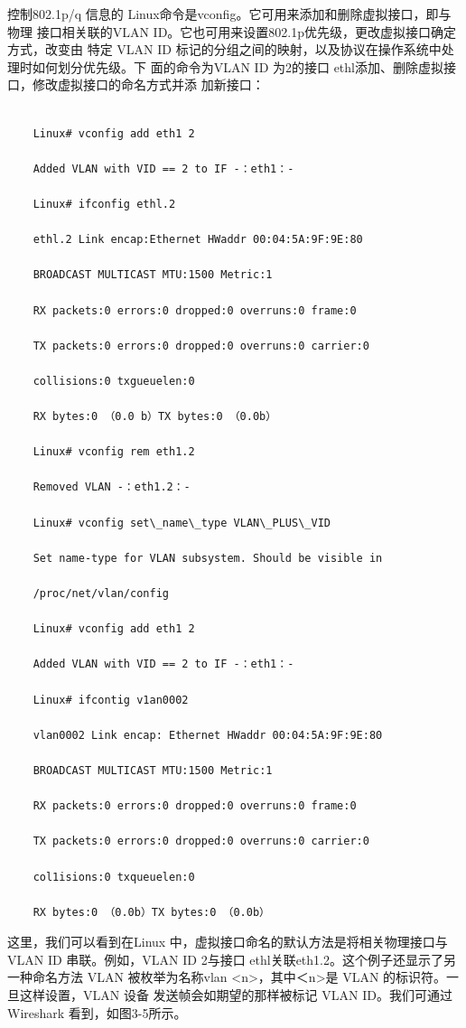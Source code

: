 控制802.1p/q 信息的 Linux命令是vconfig。它可用来添加和删除虚拟接口，即与物理
接口相关联的VLAN ID。它也可用来设置802.1p优先级，更改虚拟接口确定方式，改变由
特定 VLAN ID 标记的分组之间的映射，以及协议在操作系统中处理时如何划分优先级。下
面的命令为VLAN ID 为2的接口 ethl添加、删除虚拟接口，修改虚拟接口的命名方式并添
加新接口：
\begin{verbatim}
    
    Linux# vconfig add eth1 2
    
    Added VLAN with VID == 2 to IF -：eth1：-
    
    Linux# ifconfig ethl.2
    
    ethl.2 Link encap:Ethernet HWaddr 00:04:5A:9F:9E:80
    
    BROADCAST MULTICAST MTU:1500 Metric:1
    
    RX packets:0 errors:0 dropped:0 overruns:0 frame:0
    
    TX packets:0 errors:0 dropped:0 overruns:0 carrier:0
    
    collisions:0 txgueuelen:0
    
    RX bytes:0 （0.0 b）TX bytes:0 （0.0b）
    
    Linux# vconfig rem eth1.2
    
    Removed VLAN -：eth1.2：-
    
    Linux# vconfig set\_name\_type VLAN\_PLUS\_VID
    
    Set name-type for VLAN subsystem. Should be visible in
    
    /proc/net/vlan/config
    
    Linux# vconfig add eth1 2
    
    Added VLAN with VID == 2 to IF -：eth1：-
    
    Linux# ifcontig v1an0002
    
    vlan0002 Link encap: Ethernet HWaddr 00:04:5A:9F:9E:80
    
    BROADCAST MULTICAST MTU:1500 Metric:1
    
    RX packets:0 errors:0 dropped:0 overruns:0 frame:0
    
    TX packets:0 errors:0 dropped:0 overruns:0 carrier:0
    
    col1isions:0 txqueuelen:0
    
    RX bytes:0 （0.0b）TX bytes:0 （0.0b）
\end{verbatim}

这里，我们可以看到在Linux 中，虚拟接口命名的默认方法是将相关物理接口与 VLAN
ID 串联。例如，VLAN ID 2与接口 ethl关联eth1.2。这个例子还显示了另一种命名方法
VLAN 被枚举为名称vlan <n>，其中＜n>是 VLAN 的标识符。一旦这样设置，VLAN 设备
发送帧会如期望的那样被标记 VLAN ID。我们可通过 Wireshark 看到，如图3-5所示。

